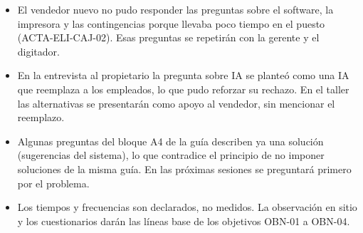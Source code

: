 \begin{itemize}
\item El vendedor nuevo no pudo responder las preguntas sobre el software, la impresora y las contingencias porque llevaba poco tiempo en el puesto (ACTA-ELI-CAJ-02). Esas preguntas se repetirán con la gerente y el digitador.
\item En la entrevista al propietario la pregunta sobre IA se planteó como una IA que reemplaza a los empleados, lo que pudo reforzar su rechazo. En el taller las alternativas se presentarán como apoyo al vendedor, sin mencionar el reemplazo.
\item Algunas preguntas del bloque A4 de la guía describen ya una solución (sugerencias del sistema), lo que contradice el principio de no imponer soluciones de la misma guía. En las próximas sesiones se preguntará primero por el problema.
\item Los tiempos y frecuencias son declarados, no medidos. La observación en sitio y los cuestionarios darán las líneas base de los objetivos OBN-01 a OBN-04.
\end{itemize}

